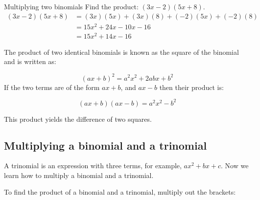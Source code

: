 \begin{wex}{Multiplying two binomials }
{Find the product: $(3x-2)(5x+8)$. }
{
\begin{align*}
  (3x-2)(5x+8) &= (3x)(5x)+(3x)(8)+(-2)(5x)+(-2)(8) \\
  &= 15{x}^{2}+24x-10x-16 \\
  &= 15{x}^{2}+14x-16
\end{align*}
} 
\end{wex}




The product of two identical binomials is known as the square of the binomial and is written as:

\begin{equation*}
{(ax+b)}^{2}={a}^{2}{x}^{2}+2abx+{b}^{2}
\end{equation*}
If the two terms are of the form $ax+b$, and $ax-b$ then their product is:

\begin{equation*}
(ax+b)(ax-b) ={a}^{2}{x}^{2}-{b}^{2}
\end{equation*}

This product yields the difference of two squares.\par 


\subsection*{Multiplying a binomial and a trinomial}







\addtocounter{footnote}{-0}

A trinomial is an expression with three terms, for example, $ax^{2} + bx + c$.
Now we learn how to multiply a binomial and a trinomial.\par 

To find the product of a binomial and a trinomial, multiply out the brackets:\\

